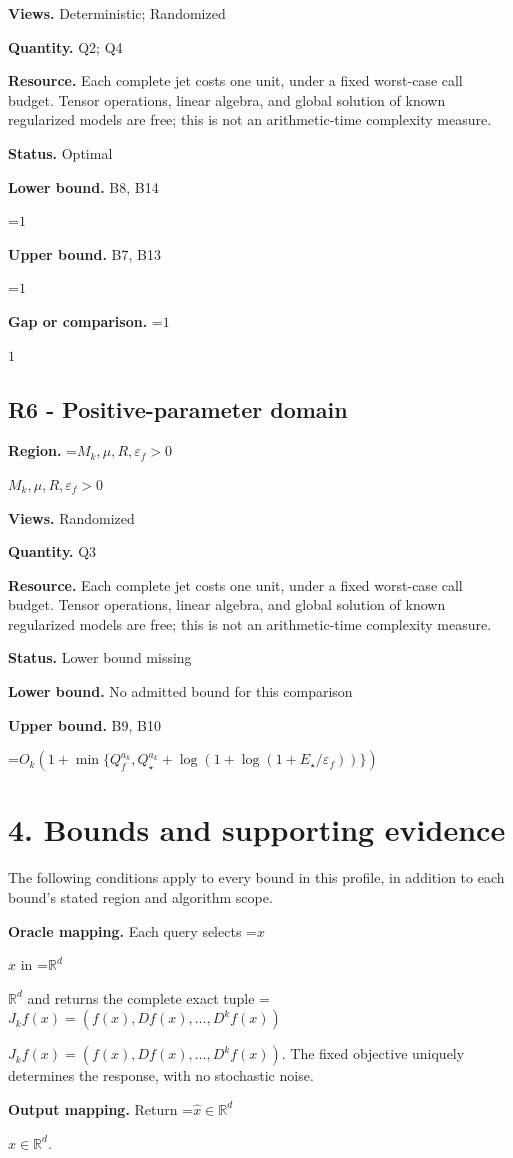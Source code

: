 \documentclass[10pt,a4paper]{article}
\newcommand{\AtlasMath}[1]{\par\begingroup\centering\setbox0=\hbox{$\displaystyle #1$}\ifdim\wd0>1.4\linewidth\typeout{ATLAS WIDE FORMULA: \the\wd0}\fi\ifdim\wd0>\linewidth\resizebox{\linewidth}{!}{\box0}\else\box0\fi\par\endgroup}
\newcommand{\AtlasInlineMath}[1]{\begingroup\setbox0=\hbox{$#1$}\ifdim\wd0>.4\linewidth\endgroup\AtlasMath{#1}\else\endgroup$#1$\fi}
\begin{document}
\textbf{Views.} Deterministic; Randomized

\textbf{Quantity.} Q2; Q4

\textbf{Resource.} Each complete jet costs one unit, under a fixed worst-case call budget. Tensor operations, linear algebra, and global solution of known regularized models are free; this is not an arithmetic-time complexity measure.

\textbf{Status.} Optimal

\textbf{Lower bound.} B8, B14

\AtlasMath{1}
\textbf{Upper bound.} B7, B13

\AtlasMath{1}
\textbf{Gap or comparison.} \AtlasInlineMath{1}

\subsection{R6 - Positive-parameter domain}
\textbf{Region.} \AtlasInlineMath{M_k,\mu,R,\varepsilon_f>0}

\textbf{Views.} Randomized

\textbf{Quantity.} Q3

\textbf{Resource.} Each complete jet costs one unit, under a fixed worst-case call budget. Tensor operations, linear algebra, and global solution of known regularized models are free; this is not an arithmetic-time complexity measure.

\textbf{Status.} Lower bound missing

\textbf{Lower bound.} No admitted bound for this comparison

\textbf{Upper bound.} B9, B10

\AtlasMath{O_k(1+\min\{Q_f^{a_k},Q_\star^{a_k}+\log(1+\log(1+E_\star/\varepsilon_f))\})}
\section{4. Bounds and supporting evidence}
The following conditions apply to every bound in this profile, in addition to each bound's stated region and algorithm scope.

\textbf{Oracle mapping.} Each query selects \AtlasInlineMath{x} in \AtlasInlineMath{\mathbb{R}^d} and returns the complete exact tuple \AtlasInlineMath{J_{k}f(x)=(f(x),Df(x),\ldots,D^{k}f(x))}. The fixed objective uniquely determines the response, with no stochastic noise.

\textbf{Output mapping.} Return \AtlasInlineMath{\widehat{x}\in \mathbb{R}^d}.
\end{document}
